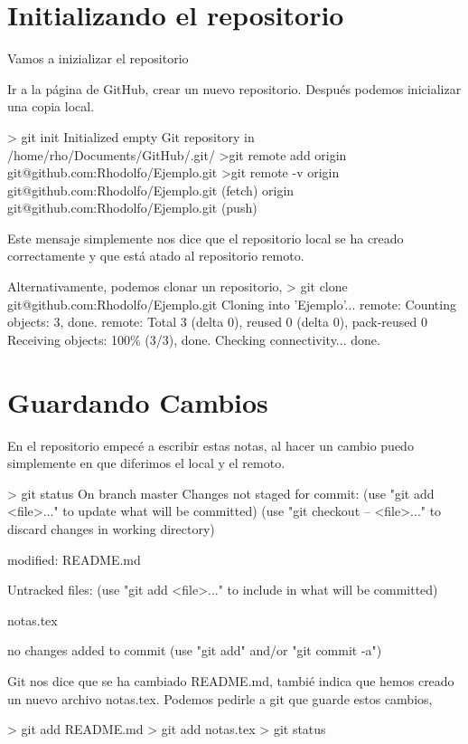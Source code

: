 \section{Initializando el repositorio}

Vamos a inizializar el repositorio

Ir a la p\'{a}gina de GitHub, crear un nuevo repositorio.
Despu\'{e}s podemos inicializar una copia local. 

> git init
Initialized empty Git repository in /home/rho/Documents/GitHub/.git/
>git remote add origin git@github.com:Rhodolfo/Ejemplo.git
>git remote -v
origin	git@github.com:Rhodolfo/Ejemplo.git (fetch)
origin	git@github.com:Rhodolfo/Ejemplo.git (push)

Este mensaje simplemente nos dice que el repositorio local se ha creado correctamente
y que est\'{a} atado al repositorio remoto.

Alternativamente, podemos clonar un repositorio,
> git clone git@github.com:Rhodolfo/Ejemplo.git
Cloning into 'Ejemplo'...
remote: Counting objects: 3, done.
remote: Total 3 (delta 0), reused 0 (delta 0), pack-reused 0
Receiving objects: 100\% (3/3), done.
Checking connectivity... done.

\section{Guardando Cambios}

En el repositorio empec\'{e} a escribir estas notas,
al hacer un cambio puedo simplemente en que diferimos el local y el remoto.

> git status
On branch master
Changes not staged for commit:
  (use "git add <file>..." to update what will be committed)
  (use "git checkout -- <file>..." to discard changes in working directory)

	modified:   README.md

Untracked files:
  (use "git add <file>..." to include in what will be committed)

	notas.tex

no changes added to commit (use "git add" and/or "git commit -a")

Git nos dice que se ha cambiado README.md,
tambi\'{e} indica que hemos creado un nuevo archivo notas.tex.
Podemos pedirle a git que guarde estos cambios,

> git add README.md
> git add notas.tex
> git status






